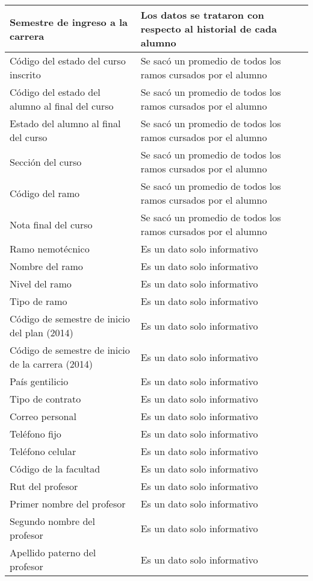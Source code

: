 \begin{longtable}{| p{5cm}| p{7cm} |}
Semestre de ingreso a la carrera &  Los datos se trataron con respecto al historial de cada alumno	\\ \hline
Código del estado del curso inscrito & Se sacó un promedio de todos los ramos cursados por el alumno	\\ \hline
Código del estado del alumno al final del curso & Se sacó un promedio de todos los ramos cursados por el alumno	\\ \hline
Estado del alumno al final del curso & Se sacó un promedio de todos los ramos cursados por el alumno	\\ \hline
Sección del curso & Se sacó un promedio de todos los ramos cursados por el alumno	\\ \hline
Código del ramo & Se sacó un promedio de todos los ramos cursados por el alumno	\\ \hline
Nota final del curso & Se sacó un promedio de todos los ramos cursados por el alumno	\\ \hline
Ramo nemotécnico & Es un dato solo informativo 	\\ \hline
Nombre del ramo & Es un dato solo informativo	\\ \hline
Nivel del ramo & Es un dato solo informativo	\\ \hline
Tipo de ramo & Es un dato solo informativo	\\ \hline
Código de semestre de inicio del plan (2014) & Es un dato solo informativo	\\ \hline
Código de semestre de inicio de la carrera (2014) & Es un dato solo informativo	\\ \hline
País gentilicio & Es un dato solo informativo	\\ \hline
Tipo de contrato & Es un dato solo informativo	\\ \hline
Correo personal & Es un dato solo informativo	\\ \hline
Teléfono fijo & Es un dato solo informativo	\\ \hline
Teléfono celular & Es un dato solo informativo	\\ \hline
Código de la facultad & Es un dato solo informativo	\\ \hline
Rut del profesor & 	Es un dato solo informativo\\ \hline
Primer nombre del profesor & Es un dato solo informativo	\\ \hline
Segundo nombre del profesor & Es un dato solo informativo	\\ \hline
Apellido paterno del profesor & Es un dato solo informativo	\\ \hline

\end{longtable}
